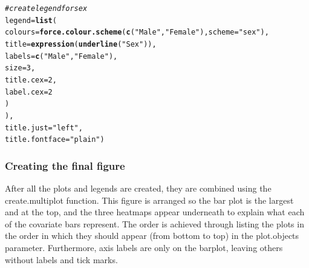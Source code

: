 \documentclass[letterpaper]{article}\usepackage[]{graphicx}\usepackage[]{color}
\makeatletter
\newcommand{\hlnum}[1]{\textcolor[rgb]{0.686,0.059,0.569}{#1}}%
\newcommand{\hlstr}[1]{\textcolor[rgb]{0.192,0.494,0.8}{#1}}%
\newcommand{\hlcom}[1]{\textcolor[rgb]{0.678,0.584,0.686}{\textit{#1}}}%
\newcommand{\hlstd}[1]{\textcolor[rgb]{0.345,0.345,0.345}{#1}}%
\newcommand{\hlkwc}[1]{\textcolor[rgb]{0.333,0.667,0.333}{#1}}%
\newcommand{\hlkwd}[1]{\textcolor[rgb]{0.737,0.353,0.396}{\textbf{#1}}}%
\newenvironment{kframe}{%
 \def\at@end@of@kframe{}%
 \ifinner\ifhmode%
  \def\at@end@of@kframe{\end{minipage}}%
  \begin{minipage}{\columnwidth}%
 \fi\fi%
 \def\FrameCommand##1{\hskip\@totalleftmargin \hskip-\fboxsep
 \colorbox{shadecolor}{##1}\hskip-\fboxsep
     \hskip-\linewidth \hskip-\@totalleftmargin \hskip\columnwidth}%
 \MakeFramed {\advance\hsize-\width
   \@totalleftmargin\z@ \linewidth\hsize
   \@setminipage}}%
 {\par\unskip\endMakeFramed%
 \at@end@of@kframe}
\newenvironment{knitrout}{}{} %
\makeatother
\begin{document}
\begin{knitrout}
\begin{kframe}
\begin{alltt}
       \hlcom{# create legend for sex}
       \hlkwc{legend} \hlstd{=} \hlkwd{list}\hlstd{(}
               \hlkwc{colours} \hlstd{=} \hlkwd{force.colour.scheme}\hlstd{(}\hlkwd{c}\hlstd{(}\hlstr{"Male"}\hlstd{,} \hlstr{"Female"}\hlstd{),}\hlkwc{scheme} \hlstd{=} \hlstr{"sex"}\hlstd{),}
               \hlkwc{title} \hlstd{=} \hlkwd{expression}\hlstd{(}\hlkwd{underline}\hlstd{(}\hlstr{"Sex"}\hlstd{)),}
               \hlkwc{labels} \hlstd{=} \hlkwd{c}\hlstd{(}\hlstr{"Male"}\hlstd{,} \hlstr{"Female"}\hlstd{),}
               \hlkwc{size} \hlstd{=} \hlnum{3}\hlstd{,}
               \hlkwc{title.cex} \hlstd{=} \hlnum{2}\hlstd{,}
               \hlkwc{label.cex} \hlstd{=} \hlnum{2}
               \hlstd{)}
       \hlstd{),}
       \hlkwc{title.just} \hlstd{=} \hlstr{"left"}\hlstd{,}
       \hlkwc{title.fontface} \hlstd{=} \hlstr{"plain"}\hlstd{)}
\end{alltt}
\end{kframe}
\end{knitrout}

\subsubsection{Creating the final figure}
After all the plots and legends are created, they are combined using the create.multiplot function. This figure is arranged so the bar plot is the largest and at the top, and the three heatmaps appear underneath to explain what each of the covariate bars represent. The order is achieved through listing the plots in the order in which they should appear (from bottom to top) in the plot.objects parameter. Furthermore, axis labels are only on the barplot, leaving others without labels and tick marks.
\end{document}
